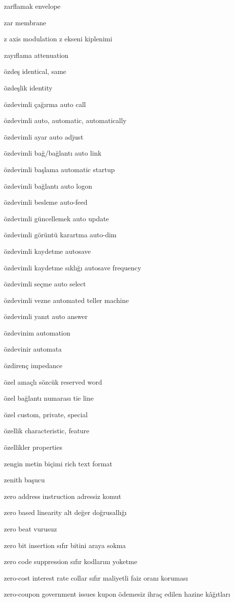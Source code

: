 \documentclass[12pt,fleqn]{article}\usepackage{../../common}
\begin{document}
zarflamak envelope

zar membrane

z axis modulation z ekseni kiplenimi

zayıflama attenuation

özdeş identical, same

özdeşlik identity

özdevimli çağırma auto call

özdevimli auto, automatic, automatically

özdevimli ayar auto adjust

özdevimli bağ/bağlantı auto link

özdevimli başlama automatic startup

özdevimli bağlantı auto logon

özdevimli besleme auto-feed

özdevimli güncellemek auto update

özdevimli görüntü karartma auto-dim

özdevimli kaydetme autosave

özdevimli kaydetme sıklığı autosave frequency

özdevimli seçme auto select

özdevimli vezne automated teller machine

özdevimli yanıt auto answer

özdevinim automation

özdevinir automata

özdirenç impedance

özel amaçlı sözcük reserved word

özel bağlantı numarası tie line

özel custom, private, special

özellik characteristic, feature

özellikler properties

zengin metin biçimi rich text format

zenith başucu

zero address instruction adressiz komut

zero based linearity alt değer doğrusallığı

zero beat vurusuz

zero bit insertion sıfır bitini araya sokma

zero code suppression sıfır kodlarını yoketme

zero-cost interest rate collar sıfır maliyetli faiz oranı koruması

zero-coupon government issues kupon ödemesiz ihraç edilen hazine kâğıtları
\end{document}
